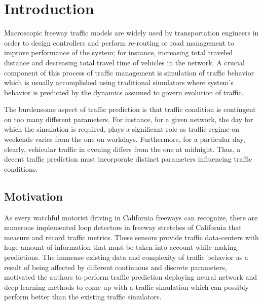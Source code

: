 \documentclass[11pt]{article}
\begin{document}
\section{Introduction}

\par Macroscopic freeway traffic models are widely used by transportation engineers in order to design controllers and perform re-routing or road management to improve performance of the system; for instance, increasing total traveled distance and decreasing total travel time of vehicles in the network. A crucial component of this process of traffic management is simulation of traffic behavior which is usually accomplished using traditional simulators where system's behavior is predicted by the dynamics assumed to govern evolution of traffic.

The burdensome aspect of traffic prediction is that traffic condition is contingent on too many different parameters. For instance, for a given network, the day for which the simulation is required, plays a significant role as traffic regime on weekends varies from the one on workdays. Furthermore, for a particular day, clearly, vehicular traffic in evening differs from the one at midnight. Thus, a decent traffic prediction must incorporate distinct parameters influencing traffic conditions.

\subsection{Motivation}

As every watchful motorist driving in California freeways can recognize, there are numerous implemented loop detectors in freeway stretches of California that measure and record traffic metrics. These sensors provide traffic data-centers with huge amount of information that must be taken into account while making predictions. The immense existing data and complexity of traffic behavior as a result of being affected by different continuous and discrete parameters, motivated the authors to perform traffic prediction deploying neural network and deep learning methods to come up with a traffic simulation which can possibly perform better than the existing traffic simulators\cite{neuralForcast}. 
\end{document}
